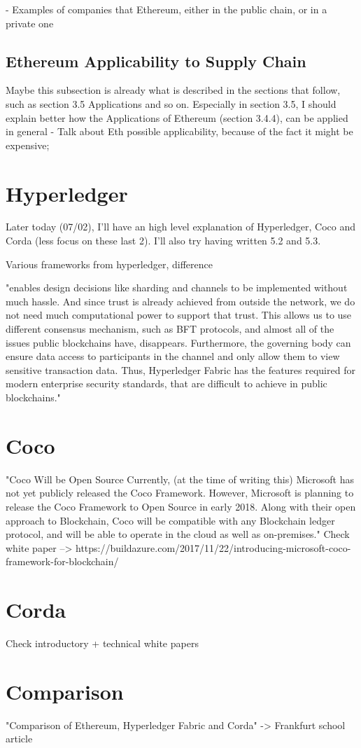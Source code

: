 - Examples of companies that Ethereum, either in the public chain, or in a private one

\subsection{Ethereum Applicability to Supply Chain}
Maybe this subsection is already what is described in the sections that follow, such as section 3.5 Applications and so on. Especially in section 3.5, I should explain better how the Applications of Ethereum (section 3.4.4), can be applied in general
- Talk about Eth possible applicability, because of the fact it might be expensive;
\fi

\section{Hyperledger}

Later today (07/02), I'll have an  high level explanation of Hyperledger, Coco and Corda (less focus on these last 2). I'll also try having written 5.2 and 5.3.

Various frameworks from hyperledger, difference

"enables design decisions like sharding and channels to be implemented without much hassle. And since trust is already achieved from outside the network, we do not need much computational power to support that trust. This allows us to use different consensus mechanism, such as BFT protocols, and almost all of the issues public blockchains have, disappears. Furthermore, the governing body can ensure data access to participants in the channel and only allow them to view sensitive transaction data. Thus, Hyperledger Fabric has the features required for modern enterprise security standards, that are difficult to achieve in public
blockchains."

\section{Coco}
"Coco Will be Open Source
Currently, (at the time of writing this) Microsoft has not yet publicly released the Coco Framework. However, Microsoft is planning to release the Coco Framework to Open Source in early 2018. Along with their open approach to Blockchain, Coco will be compatible with any Blockchain ledger protocol, and will be able to operate in the cloud as well as on-premises."
Check white paper
--> https://buildazure.com/2017/11/22/introducing-microsoft-coco-framework-for-blockchain/
\section{Corda}
Check introductory + technical white papers
\section{Comparison}
"Comparison of Ethereum,
Hyperledger Fabric and
Corda" -> Frankfurt school article
